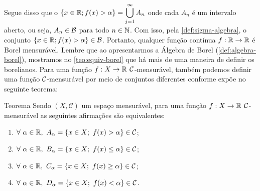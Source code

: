 	Segue disso que o
	$\{x \in \mathbb{R}; f(x) > \alpha\} = \displaystyle \bigcup_{j = 1}^\infty A_n$ onde cada $A_n$ é um intervalo aberto, ou seja, $A_n \in \operatorname{\mathcal{B}}$ para todo $n \in \operatorname{\mathbb{N}}$.
	Com isso, pela \ref{def:sigma-algebra}, o conjunto $\{x \in \mathbb{R}; f(x) > \alpha\} \in \operatorname{\mathcal{B}}$.
	Portanto, qualquer função contínua $f: \mathbb{R} \to \mathbb{R}$ é Borel mensurável.
    Lembre que ao apresentarmos a Álgebra de Borel (\ref{def:algebra-borel}), mostramos no \ref{teo:equiv-borel} que há mais de uma maneira de definir os borelianos.
    Para uma função $f: X \to \mathbb{R}$ $\operatorname{\mathcal{C}}$-mensurável, também podemos definir uma função $\operatorname{\mathcal{C}}$-mensurável por meio de conjuntos diferentes conforme expõe \cite{bartle} no seguinte teorema:
\begin{env}{Teorema}
\label{teo:equiv-funcoes-mensuraveis}
    Sendo $(X,\mathcal{C})$ um espaço mensurável, para uma função $f: X \to \mathbb{R}$ $\operatorname{\mathcal{C}}$-mensurável as seguintes afirmações são equivalentes:
    \vspace{-0.4cm}
    \begin{multicols}{2}    	
	    \begin{enumerate}[label=(\alph*)]
	        \item $\forall \ \alpha \in \mathbb{R}, \ A_\alpha =\{x \in X;\ f(x) > \alpha \} \in \mathcal{C}$;
	        \item $\forall \ \alpha \in \mathbb{R}, \ B_\alpha =\{x \in X;\ f(x) \leq \alpha \} \in \mathcal{C}$;
	        \item $\forall \ \alpha \in \mathbb{R}, \ C_\alpha =\{x \in X;\ f(x) \geq \alpha \} \in \mathcal{C}$;
	        \item $\forall \ \alpha \in \mathbb{R}, \ D_\alpha =\{x \in X;\ f(x) < \alpha \} \in \mathcal{C}$.
	    \end{enumerate}
     \end{multicols}
	\vspace{-0.2cm}
\end{env}
